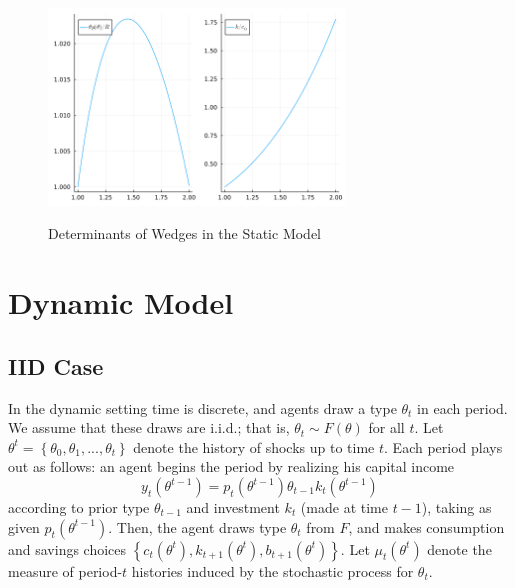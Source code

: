 \documentclass[11pt]{article}
\begin{document}
\begin{figure}[htbp]
    \centering
    \caption{Determinants of Wedges in the Static Model}
    \includegraphics[width = 0.7\textwidth]{figures/determs.png}
    \label{fig:determs}
\end{figure}

\section{Dynamic Model} \label{sec:dyn_mod}

\subsection{IID Case}

In the dynamic setting time is discrete, and agents draw a type $\theta_{t}$
in each period. We assume that these draws are i.i.d.; that is, $\theta_{t}\sim F(\theta)$
for all $t$. Let $\theta^{t}=\left\{ \theta_{0},\theta_{1},...,\theta_{t}\right\} $
denote the history of shocks up to time $t$. Each period plays out
as follows: an agent begins the period by realizing his capital income
\begin{equation}
    y_{t}\left(\theta^{t-1}\right)=p_{t}\left(\theta^{t-1}\right)\theta_{t-1}k_{t}\left(\theta^{t-1}\right) \label{eq:dyn_yt}
\end{equation}
according to prior type $\theta_{t-1}$ and investment $k_{t}$ (made
at time $t-1$), taking as given $p_{t}\left(\theta^{t-1}\right)$.
Then, the agent draws type $\theta_{t}$ from $F$, and makes consumption
and savings choices $\left\{ c_{t}\left(\theta^{t}\right),k_{t+1}\left(\theta^{t}\right),b_{t+1}\left(\theta^{t}\right)\right\} $.
Let $\mu_{t}\left(\theta^{t}\right)$ denote the measure of period-$t$
histories induced by the stochastic process for $\theta_{t}$. 
\end{document}
